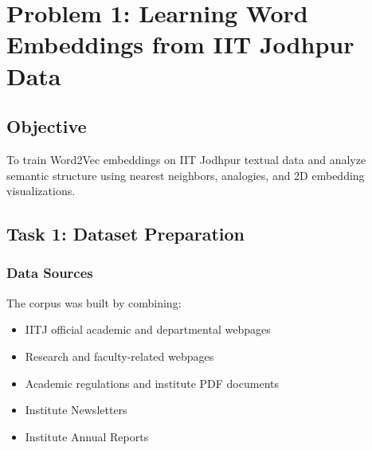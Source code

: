 \documentclass[11pt,a4paper]{article}
\begin{document}

\section{Problem 1: Learning Word Embeddings from IIT Jodhpur Data}

\subsection{Objective}
To train Word2Vec embeddings on IIT Jodhpur textual data and analyze semantic structure using nearest neighbors, analogies, and 2D embedding visualizations.

\subsection{Task 1: Dataset Preparation}

\subsubsection{Data Sources}
The corpus was built by combining:
\begin{itemize}[leftmargin=1.5em]
    \item IITJ official academic and departmental webpages
    \item Research and faculty-related webpages
    \item Academic regulations and institute PDF documents
    \item Institute Newsletters
    \item Institute Annual Reports
\end{itemize}
\end{document}
